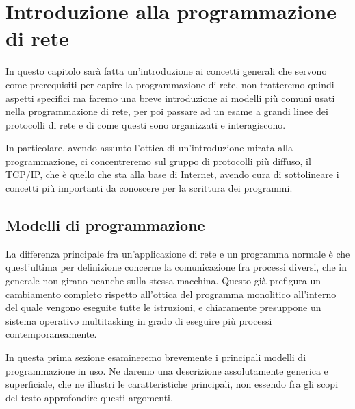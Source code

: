 
\chapter{Introduzione alla programmazione di rete}
\label{cha:network}

In questo capitolo sarà fatta un'introduzione ai concetti generali che servono
come prerequisiti per capire la programmazione di rete, non tratteremo quindi
aspetti specifici ma faremo una breve introduzione ai modelli più comuni usati
nella programmazione di rete, per poi passare ad un esame a grandi linee dei
protocolli di rete e di come questi sono organizzati e interagiscono.

In particolare, avendo assunto l'ottica di un'introduzione mirata alla
programmazione, ci concentreremo sul gruppo di protocolli più diffuso, il
TCP/IP, che è quello che sta alla base di Internet, avendo cura di
sottolineare i concetti più importanti da conoscere per la scrittura dei
programmi.



\section{Modelli di programmazione}
\label{sec:net_prog_model}

La differenza principale fra un'applicazione di rete e un programma normale è
che quest'ultima per definizione concerne la comunicazione fra processi
diversi, che in generale non girano neanche sulla stessa macchina. Questo già
prefigura un cambiamento completo rispetto all'ottica del programma monolitico
all'interno del quale vengono eseguite tutte le istruzioni, e chiaramente
presuppone un sistema operativo multitasking in grado di eseguire più processi
contemporaneamente.

In questa prima sezione esamineremo brevemente i principali modelli di
programmazione in uso. Ne daremo una descrizione assolutamente generica e
superficiale, che ne illustri le caratteristiche principali, non essendo fra
gli scopi del testo approfondire questi argomenti.

